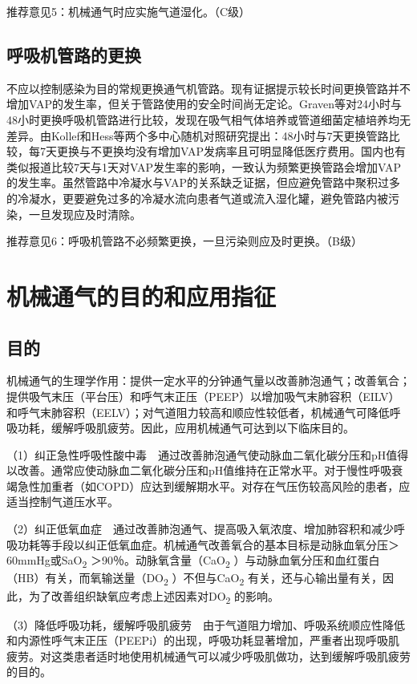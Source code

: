 推荐意见5：机械通气时应实施气道湿化。（C级）

\subsection{呼吸机管路的更换}

不应以控制感染为目的常规更换通气机管路。现有证据提示较长时间更换管路并不增加VAP的发生率，但关于管路使用的安全时间尚无定论。Graven等对24小时与48小时更换呼吸机管路进行比较，发现在吸气相气体培养或管道细菌定植培养均无差异。由Kollef和Hess等两个多中心随机对照研究提出：48小时与7天更换管路比较，每7天更换与不更换均没有增加VAP发病率且可明显降低医疗费用。国内也有类似报道比较7天与1天对VAP发生率的影响，一致认为频繁更换管路会增加VAP的发生率。虽然管路中冷凝水与VAP的关系缺乏证据，但应避免管路中聚积过多的冷凝水，更要避免过多的冷凝水流向患者气道或流入湿化罐，避免管路内被污染，一旦发现应及时清除。

推荐意见6：呼吸机管路不必频繁更换，一旦污染则应及时更换。（B级）

\section{机械通气的目的和应用指征}

\subsection{目的}

机械通气的生理学作用：提供一定水平的分钟通气量以改善肺泡通气；改善氧合；提供吸气末压（平台压）和呼气末正压（PEEP）以增加吸气末肺容积（EILV）和呼气末肺容积（EELV）；对气道阻力较高和顺应性较低者，机械通气可降低呼吸功耗，缓解呼吸肌疲劳。因此，应用机械通气可达到以下临床目的。

（1）纠正急性呼吸性酸中毒　通过改善肺泡通气使动脉血二氧化碳分压和pH值得以改善。通常应使动脉血二氧化碳分压和pH值维持在正常水平。对于慢性呼吸衰竭急性加重者（如COPD）应达到缓解期水平。对存在气压伤较高风险的患者，应适当控制气道压水平。

（2）纠正低氧血症　通过改善肺泡通气、提高吸入氧浓度、增加肺容积和减少呼吸功耗等手段以纠正低氧血症。机械通气改善氧合的基本目标是动脉血氧分压＞60mmHg或SaO\textsubscript{2}
＞90％。动脉氧含量（CaO\textsubscript{2}
）与动脉血氧分压和血红蛋白（HB）有关，而氧输送量（DO\textsubscript{2}
）不但与CaO\textsubscript{2}
有关，还与心输出量有关，因此，为了改善组织缺氧应考虑上述因素对DO\textsubscript{2}
的影响。

（3）降低呼吸功耗，缓解呼吸肌疲劳　由于气道阻力增加、呼吸系统顺应性降低和内源性呼气末正压（PEEPi）的出现，呼吸功耗显著增加，严重者出现呼吸肌疲劳。对这类患者适时地使用机械通气可以减少呼吸肌做功，达到缓解呼吸肌疲劳的目的。


